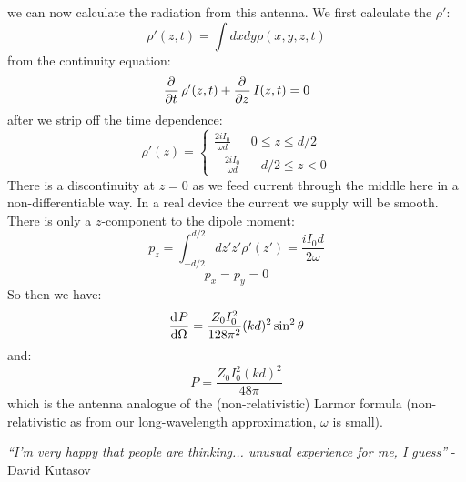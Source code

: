 we can now calculate the radiation from this antenna. We first calculate the $\rho'$:
\begin{equation}
    \rho'(z, t) = \int dxdy \rho(x, y, z, t)
\end{equation}
from the continuity equation:
\begin{equation}
    \dpd{}{t}\rho'(z, t) + \dpd{}{z}I(z, t) = 0 
\end{equation}
after we strip off the time dependence:
\begin{equation}
    \rho'(z) = \begin{cases}
        \frac{2iI_0}{\omega d} & 0 \leq z \leq d/2
        \\ -\frac{2iI_0}{\omega d} & -d/2 \leq z < 0
    \end{cases}
\end{equation}
There is a discontinuity at $z = 0$ as we feed current through the middle here in a non-differentiable way. In a real device the current we supply will be smooth. There is only a $z$-component to the dipole moment:
\begin{equation}
    p_z = \int_{-d/2}^{d/2}dz' z' \rho'(z') = \frac{iI_0d}{2\omega}
\end{equation}
\begin{equation}
    p_x = p_y = 0
\end{equation}
So then we have:
\begin{equation}
    \dod{P}{\Omega} = \frac{Z_0I_0^2}{128\pi^2}(kd)^2\sin^2\theta
\end{equation}
and:
\begin{equation}
    P = \frac{Z_0 I_0^2(kd)^2}{48\pi}
\end{equation}
which is the antenna analogue of the (non-relativistic) Larmor formula (non-relativistic as from our long-wavelength approximation, $\omega$ is small).

\emph{``I'm very happy that people are thinking... unusual experience for me, I guess''} - David Kutasov

